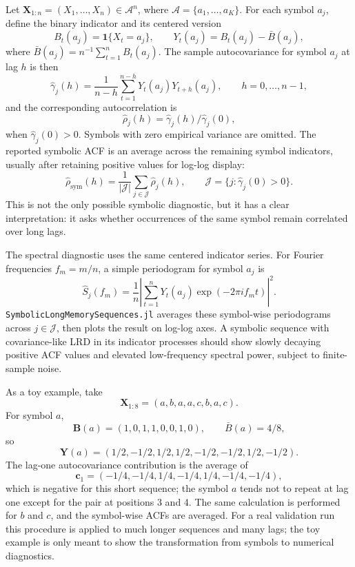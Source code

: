 \documentclass[journal]{IEEEtran}
\newcommand{\pkg}[1]{\texttt{#1}}
\newcommand{\vect}[1]{\boldsymbol{#1}}
\newcommand{\sfive}{\pkg{SymbolicLongMemorySequences.jl}}
\begin{document}
Let \(\vect{X}_{1:n}=(X_1,\ldots,X_n)\in\mathcal{A}^n\), where
\(\mathcal{A}=\{a_1,\ldots,a_K\}\). For each symbol \(a_j\), define the binary
indicator and its centered version
\begin{equation}
  B_t(a_j)=\mathbf{1}\{X_t=a_j\}, \qquad
  Y_t(a_j)=B_t(a_j)-\bar B(a_j),
\end{equation}
where \(\bar B(a_j)=n^{-1}\sum_{t=1}^n B_t(a_j)\). The sample autocovariance for
symbol \(a_j\) at lag \(h\) is then
\begin{equation}
  \hat\gamma_j(h)=
  \frac{1}{n-h}\sum_{t=1}^{n-h}Y_t(a_j)Y_{t+h}(a_j),
  \qquad h=0,\ldots,n-1,
\end{equation}
and the corresponding autocorrelation is
\begin{equation}
  \hat\rho_j(h)=\hat\gamma_j(h)/\hat\gamma_j(0),
\end{equation}
when \(\hat\gamma_j(0)>0\). Symbols with zero empirical variance are omitted.
The reported symbolic ACF is an average across the remaining symbol indicators,
usually after retaining positive values for log-log display:
\begin{equation}
  \hat\rho_{\mathrm{sym}}(h)=
  \frac{1}{|\mathcal{J}|}\sum_{j\in\mathcal{J}}\hat\rho_j(h),
  \qquad
  \mathcal{J}=\{j:\hat\gamma_j(0)>0\}.
\end{equation}
This is not the only possible symbolic diagnostic, but it has a clear
interpretation: it asks whether occurrences of the same symbol remain
correlated over long lags.

The spectral diagnostic uses the same centered indicator series. For Fourier
frequencies \(f_m=m/n\), a simple periodogram for symbol \(a_j\) is
\begin{equation}
  \hat S_j(f_m)=
  \frac{1}{n}\left|
    \sum_{t=1}^n Y_t(a_j)\exp(-2\pi i f_m t)
  \right|^2 .
\end{equation}
\sfive{} averages these symbol-wise periodograms across \(j\in\mathcal{J}\), then
plots the result on log-log axes. A symbolic sequence with covariance-like LRD
in its indicator processes should show slowly decaying positive ACF values and
elevated low-frequency spectral power, subject to finite-sample noise.

As a toy example, take
\[
  \vect{X}_{1:8}=(a,b,a,a,c,b,a,c).
\]
For symbol \(a\),
\[
  \vect{B}(a)=(1,0,1,1,0,0,1,0), \qquad \bar B(a)=4/8,
\]
so
\[
  \vect{Y}(a)=(1/2,-1/2,1/2,1/2,-1/2,-1/2,1/2,-1/2).
\]
The lag-one autocovariance contribution is the average of
\[
  \vect{c}_1=(-1/4,-1/4,1/4,-1/4,1/4,-1/4,-1/4),
\]
which is negative for this short sequence; the symbol \(a\) tends not to repeat
at lag one except for the pair at positions 3 and 4. The same calculation is
performed for \(b\) and \(c\), and the symbol-wise ACFs are averaged. For a real
validation run this procedure is applied to much longer sequences and many
lags; the toy example is only meant to show the transformation from symbols to
numerical diagnostics.
\end{document}

